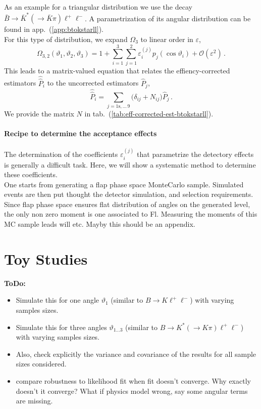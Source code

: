 \documentclass[aps,prd,reprint,nofootinbib,preprintnumbers]{revtex4}
\newcommand{\refapp}[1]{app.~(\ref{app:#1})}
\newcommand{\reftab}[1]{tab.~(\ref{tab:#1})}
\renewcommand{\theta}{\vartheta}
\newcommand{\order}[1]{\mathcal{O}\left({#1}\right)}
\let\eps\varepsilon
\newcommand{\what}[1]{\widehat{#1}}
\newcommand{\wwhat}[1]{\widehat{\widehat{#1}}}
\newcommand{\todo}[1]{{\color{red}\bf ToDo: #1}}
\begin{document}
As an example for a triangular distribution we use the decay $\bar{B}\to\bar{K}^*(\to \bar{K}\pi)\ell^+\ell^-$.
A parametrization of its angular distribution can be found in \refapp{btokstarll}.\\

For this type of distribution, we expand $\Omega_3$ to linear order in $\eps$,
\begin{equation}
    \Omega_{3,2}(\theta_1,\theta_2,\theta_3) = 1 + \sum_{i=1}^3 \sum_{j=1}^2 \eps_i^{(j)} p_j(\cos\theta_i) + \order{\eps^2}\,.
\end{equation}
This leads to a matrix-valued equation that relates the effiency-corrected estimators $\wwhat{P}_i$ to the uncorrected
estimators $\what{P}_j$,
\begin{equation}
    \label{eq:eff-corrected-est-btokstarll}
    \wwhat{P}_i = \sum_{j=1\text{s},\dots\,9} \big(\delta_{ij} + N_{ij}\big) \what{P}_j\,.
\end{equation}
We provide the matrix $N$ in \reftab{eff-corrected-est-btokstarll}.\\

\paragraph{Recipe to determine the acceptance effects}

The determination of the coefficients $\eps_i^{(j)}$ that parametrize the detectory effects is generally
a difficult task. Here, we will show a systematic method to determine these coefficients.\\
One starts from generating a flap phase space MonteCarlo sample. Simulated events are then put thought the detector simulation, and selection requirements. Since flap phase space ensures flat distribution of angles on the generated level, the only non zero moment is one associated to Fl. Measuring the moments of this MC sample leads will etc. Mayby this should be an appendix.





\section{Toy Studies}
\label{sec:numerics}

\todo{
\begin{itemize}
    \item Simulate this for one angle $\theta_{1}$ (similar to $B\to K \ell^+\ell^-$) with varying samples sizes.
    \item Simulate this for three angles $\theta_{1\dots 3}$ (similar to $B\to K^*(\to K \pi)\ell^+\ell^-$) with varying samples sizes.
    \item Also, check explicitly the variance and covariance of the results for all sample sizes considered.
    \item compare robustness to likelihood fit when fit doesn't
      converge. Why exactly doesn't it converge? What if physics model
      wrong, say some angular terms are missing.
\end{itemize}}
\end{document}
